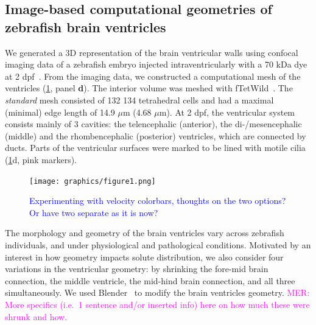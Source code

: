 \documentclass[fleqn]{wlscirep}
\newcommand{\lyng}[1]{\textcolor{blue}{#1}}
\newcommand{\mer}[1]{\textcolor{magenta}{#1}}
\begin{document}
\subsection*{Image-based computational geometries of zebrafish brain ventricles}
We generated a 3D representation of the brain ventricular walls using confocal imaging data of a zebrafish embryo injected intraventricularly with a 70 kDa dye at 2 dpf~\cite{Olstad2019CiliaryDevelopment}. From the imaging data, we constructed a computational mesh of the ventricles (\cref{fig:figure1}, panel \textbf{d}). The interior volume was meshed with fTetWild~\cite{Hu2020FastWild}. The \emph{standard} mesh consisted of 132 134 tetrahedral cells and had a maximal (minimal) edge length of 14.9 $\mu$m (4.68 $\mu$m). At 2 dpf, the ventricular system consists mainly of 3 cavities: the telencephalic  (anterior), the di-/mesencephalic  (middle) and the rhombencephalic (posterior) ventricles, which are connected by ducts. Parts of the ventricular surfaces were marked to be lined with motile cilia~\cite{Olstad2019CiliaryDevelopment} (\cref{fig:figure1}d, pink markers).
\begin{figure}%
    \centering
    \texttt{[image: graphics/figure1.png]}
    \caption{\lyng{Experimenting with velocity colorbars, thoughts on the two options? Or have two separate as it is now?}}
    \label{fig:figure1}
\end{figure}

The morphology and geometry of the brain ventricles vary across zebrafish individuals, and under physiological and pathological conditions. Motivated by an interest in how geometry impacts solute distribution, we also consider four variations in the ventricular geometry: by shrinking the fore-mid brain connection, the middle ventricle, the mid-hind brain connection, and all three simultaneously. We used Blender~\cite{Community2018BlenderPackage} to modify the brain ventricles geometry. \mer{MER: More specifics (i.e.~1 sentence and/or inserted info) here on how much these were shrunk and how.}

\end{document}
